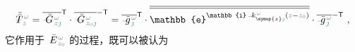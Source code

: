 \begin{align} \label{eq:transition_matrix}
	\Xint{\mathcolor{gray}{-}}{35}{\bar{\bar{T}}}^{\;\!\mathcolor{gray}{\omega}}_{\;\! \mathcolor{gray}{z}} = \overline{\Xint{\mathcolor{gray}{-}}{20}{\bar{G}}^{\;\!\mathcolor{gray}{\omega}}_{\;\! \mathcolor{gray}{z} \textcolor{ForestGreen}{\jmath}}}^\mathsf{T} \cdot \overline{\Xint{\mathcolor{gray}{-}}{20}{\bar{G}}^{\;\!\mathcolor{gray}{\omega}}_{\;\! \mathcolor{gray}{z_0} \textcolor{ForestGreen}{\jmath}}}^\mathsf{-T} = \overline{\Xint{{}^{}_{\mathcolor{gray}{-}}}{10}{\bar{g}}^{\;\!\mathcolor{gray}{\omega}}_{\;\! \textcolor{ForestGreen}{\jmath}}}^\mathsf{T} \cdot \overline{\overline{\mathbb{e}^{\mathbb{i} \Xint{\begin{smallmatrix} ~ \\ {}^{}_{\mathcolor{gray}{-}} \\ ~ \end{smallmatrix}}{15}{k}_{\symup{z} \textcolor{ForestGreen}{\jmath}}^{\;\! \mathcolor{gray}{\omega}} \left( \mathcolor{gray}{z} - \mathcolor{gray}{z_0} \right)}}} \cdot \overline{\Xint{{}^{}_{\mathcolor{gray}{-}}}{10}{\bar{g}}^{\;\!\mathcolor{gray}{\omega}}_{\;\! \textcolor{ForestGreen}{\jmath}}}^\mathsf{-T} ~,
\end{align}
它作用于 $\Xint{\mathcolor{gray}{-}}{25}{\bar{E}}^{\;\!\mathcolor{gray}{\omega}}_{\;\! \mathcolor{gray}{z_0}}$ 的过程，既可以被认为
